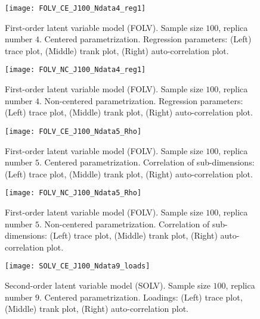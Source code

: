%
\begin{figure}[H]
	\centering
	\texttt{[image: FOLV\_CE\_J100\_Ndata4\_reg1]}
	\caption[First-order latent variable model (FOLV). Sample size $100$, replica number $4$. Centered parametrization. Regression parameters. Trace, trank and auto-correlation plots.]%
	{First-order latent variable model (FOLV). Sample size $100$, replica number $4$. Centered parametrization. Regression parameters: (Left) trace plot, (Middle) trank plot, (Right) auto-correlation plot.}
	\label{fig:FOLV_CE_chains7}
\end{figure}
%
\begin{figure}[H]
	\centering
	\texttt{[image: FOLV\_NC\_J100\_Ndata4\_reg1]}
	\caption[First-order latent variable model (FOLV). Sample size $100$, replica number $4$. Non-centered parametrization. Regression parameters. Trace, trank and auto-correlation plots.]%
	{First-order latent variable model (FOLV). Sample size $100$, replica number $4$. Non-centered parametrization. Regression parameters: (Left) trace plot, (Middle) trank plot, (Right) auto-correlation plot.}
	\label{fig:FOLV_NC_chains7}
\end{figure}
%
\begin{figure}[H]
	\centering
	\texttt{[image: FOLV\_CE\_J100\_Ndata5\_Rho]}
	\caption[First-order latent variable model (FOLV). Sample size $100$, replica number $5$. Centered parametrization. Correlation of sub-dimensions. Trace, trank and auto-correlation plots.]%
	{First-order latent variable model (FOLV). Sample size $100$, replica number $5$. Centered parametrization. Correlation of sub-dimensions: (Left) trace plot, (Middle) trank plot, (Right) auto-correlation plot.}
	\label{fig:FOLV_CE_chains8}
\end{figure}
%
\begin{figure}[H]
	\centering
	\texttt{[image: FOLV\_NC\_J100\_Ndata5\_Rho]}
	\caption[First-order latent variable model (FOLV). Sample size $100$, replica number $5$. Non-centered parametrization. Correlation of sub-dimensions. Trace, trank and auto-correlation plots.]%
	{First-order latent variable model (FOLV). Sample size $100$, replica number $5$. Non-centered parametrization. Correlation of sub-dimensions: (Left) trace plot, (Middle) trank plot, (Right) auto-correlation plot.}
	\label{fig:FOLV_NC_chains8}
\end{figure}
%
\begin{figure}[H]
	\centering
	\texttt{[image: SOLV\_CE\_J100\_Ndata9\_loads]}
	\caption[Second-order latent variable model (SOLV). Sample size $100$, replica number $9$. Centered parametrization. Loadings. Trace, trank and auto-correlation plots.]%
	{Second-order latent variable model (SOLV). Sample size $100$, replica number $9$. Centered parametrization. Loadings: (Left) trace plot, (Middle) trank plot, (Right) auto-correlation plot.}
	\label{fig:SOLV_CE_chains1}
\end{figure}
